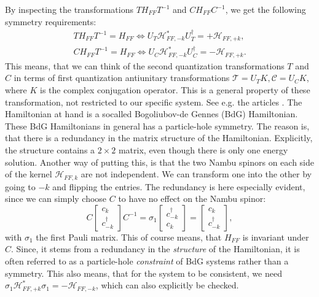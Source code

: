 By inspecting the transformations $TH_{FF}T^{-1}$ and $CH_{FF}C^{-1}$, we get the following symmetry requirements:
\begin{align}
TH_{FF}T^{-1} = H_{FF} \Leftrightarrow U_T\mathcal{H}^*_{FF,-k} U^\dagger_T = + \mathcal{H}_{FF,+k}, \nonumber \\
CH_{FF}T^{-1} = H_{FF} \Leftrightarrow U_C\mathcal{H}^*_{FF,-k} U^\dagger_C = - \mathcal{H}_{FF,+k}. 
\label{eq.Symmetryrequirements}
\end{align}
This means, that we can think of the second quantization transformations $T$ and $C$ in terms of first quantization antiunitary transformations $\mathcal{T} = U_TK, \mathcal{C} = U_CK$, where $K$ is the complex conjugation operator. This is a general property of these transformation, not restricted to our specific system. See e.g. the articles \cite{Ludwig.Topology, Chiu.Topology}. The Hamiltonian at hand is a socalled Bogoliubov-de Gennes (BdG) Hamiltonian. These BdG Hamiltonians in general has a particle-hole symmetry. The reason is, that there is a redundancy in the matrix structure of the Hamiltonian. Explicitly, the structure contains a $2\times 2$ matrix, even though there is only one energy solution. Another way of putting this, is that the two Nambu spinors on each side of the kernel $\mathcal{H}_{FF,k}$ are not independent. We can transform one into the other by going to $-k$ and flipping the entries. The redundancy is here especially evident, since we can simply choose $C$ to have no effect on the Nambu spinor:
\begin{equation}
C \begin{bmatrix} c_k \\ c^\dagger_{-k} \end{bmatrix} C^{-1} =  \sigma_1 \begin{bmatrix} c^\dagger_{-k} \\ c_{k} \end{bmatrix} = \begin{bmatrix} c_k \\ c^\dagger_{-k} \end{bmatrix}, 
\end{equation}
with $\sigma_1$ the first Pauli matrix. This of course means, that $H_{FF}$ is invariant under $C$. Since, it stems from a redundancy in the \textit{structure} of the Hamiltonian, it is often referred to as a particle-hole \textit{constraint} of BdG systems rather than a symmetry. This also means, that for the system to be consistent, we need $\sigma_1\mathcal{H}^*_{FF,+k} \sigma_1 = - \mathcal{H}_{FF,-k}$, which can also explicitly be checked. 

